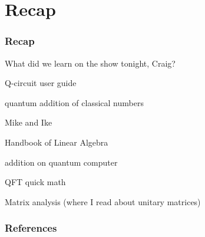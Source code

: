 \documentclass{beamer}
\theoremstyle{definition}
\begin{document}
\section{Recap}

\begin{frame}
\frametitle{Recap}
What did we learn on the show tonight, Craig? 

Q-circuit user guide \cite{eastin2004q}

quantum addition of classical numbers \cite{cherkas2016quantum}


Mike and Ike \cite{nielsen2002quantum}

Handbook of Linear Algebra \cite{hogben2006handbook}

addition on quantum computer \cite{draper2000q}

QFT quick math \cite{baconQFT}

Matrix analysis (where I read about unitary matrices) \cite{horn1990matrix}

\end{frame}

\begin{frame}
\frametitle{References}


{}



\end{frame}



 
\end{document}
